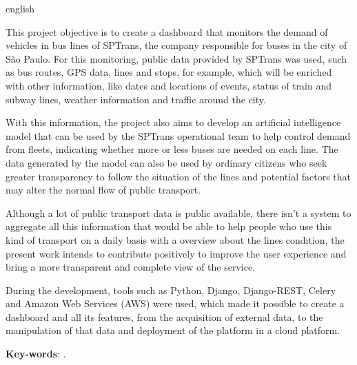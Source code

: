 \begin{resumo}[Abstract]
	\begin{otherlanguage*}{english}
	\indent
	\par This project objective is to create a dashboard that monitors the demand of vehicles in bus lines of SPTrans, the company responsible for buses in the city of São Paulo. For this monitoring, public data provided by SPTrans was used, such as bus routes, GPS data, lines and stops, for example, which will be enriched with other information, like dates and locations of events, status of train and subway lines, weather information and traffic around the city.

	\par With this information, the project also aims to develop an artificial intelligence model that can be used by the SPTrans operational team to help control demand from fleets, indicating whether more or less buses are needed on each line. The data generated by the model can also be used by ordinary citizens who seek greater transparency to follow the situation of the lines and potential factors that may alter the normal flow of public transport.

	\par Although a lot of public transport data is public available, there isn’t a system to aggregate all this information that would be able to help people who use this kind of transport on a daily basis with a overview about the lines condition, the present work intends to contribute positively to improve the user experience and bring a more transparent and complete view of the service.
	
	\par During the development, tools such as Python, Django, Django-REST, Celery and Amazon Web Services (AWS) were used, which made it possible to create a dashboard and all its features, from the acquisition of external data, to the manipulation of that data and deployment of the platform in a cloud platform.

	\textbf{Key-words}: \KeyWordA.~
	\end{otherlanguage*}
\end{resumo}
